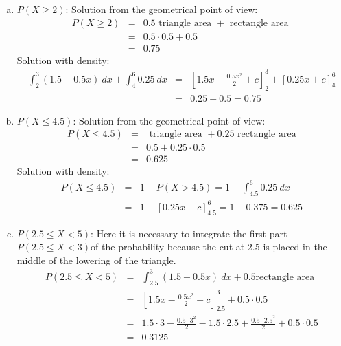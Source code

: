 \documentclass[12pt,thmsa]{article}
\begin{document}
\begin{enumerate}
  \begin{enumerate}[(a)]
  \item $P(X \ge 2)$: Solution from the geometrical point of view:
    \begin{eqnarray*}
      P(X \ge 2) &=& 0.5 \text{ triangle area } + \text{ rectangle area } \\
      &=& 0.5 \cdot 0.5 + 0.5 \\ &=& {0.75}
    \end{eqnarray*}
Solution with density:
    \begin{eqnarray*}
      \int_2^3 (1.5-0.5x) \ dx + \int_4^6 0.25 \ dx &=& \left[ 1.5x - \frac{0.5x^2}{2} + c \right]^{3}_{2} + \left[ 0.25x  + c \right]^{6}_{4} \\
    &=&  0.25 + 0.5 = 0.75
    \end{eqnarray*}  
    \item $P(X \le 4.5)$: Solution from the geometrical point of view:
    \begin{eqnarray*}
      P(X \le 4.5) &=& \text{ triangle area } + 0.25 \text{ rectangle area} \\
      &=& 0.5 + 0.25 \cdot 0.5 \\ &=& {0.625}
    \end{eqnarray*}   
    Solution with density:   
    \begin{eqnarray*}
    P(X \le 4.5) & = &  1-P(X>4.5) = 1- \int_{4.5}^6  0.25 \ dx \\
    & = & 1- \left[ 0.25x + c \right]^{6}_{4.5} = 1- 0.375 = 0.625
    \end{eqnarray*}
    
    \item $P(2.5 \le X < 5)$: Here it is necessary to integrate the first part $P(2.5 \le X < 3)$of the probability because the cut at 2.5 is placed in the middle of the lowering of the triangle.
    \begin{eqnarray*}
      P(2.5 \le X < 5) &=& \int_{2.5}^3 (1.5-0.5x) \ dx  + 0.5 \text{
        rectangle area} \\
      &=& \left[ 1.5x - \frac{0.5x^2}{2} + c \right]_{2.5}^3  +
      0.5 \cdot 0.5
      \\
      &=& 1.5 \cdot 3 - \frac{0.5 \cdot 3^2}{2} - 1.5 \cdot 2.5 +
      \frac{0.5 \cdot 2.5^2}{2} + 0.5 \cdot 0.5 \\ 
      &=& {0.3125}
    \end{eqnarray*}
  \end{enumerate}
  
\end{enumerate}
\end{document}
